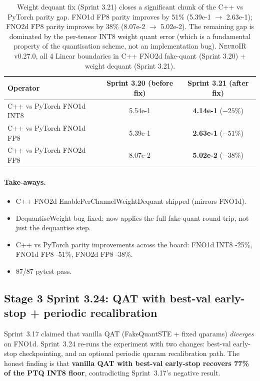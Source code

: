 \documentclass[10pt,twocolumn]{article}
\renewcommand{\texttt}[1]{{\normalfont\ttfamily #1}\normalfont\rmfamily}
\newcommand{\neuroir}{\textsc{NeuroIR}}
\begin{document}
\begin{table}[h]
\centering
\begin{tabular}{lcc}
\hline
\textbf{Operator} & \textbf{Sprint 3.20 (before fix)} & \textbf{Sprint 3.21 (after fix)} \\
\hline
C++ vs PyTorch FNO1d INT8 & 5.54e-1 & \textbf{4.14e-1} ($-25\%$) \\
C++ vs PyTorch FNO1d FP8 & 5.39e-1 & \textbf{2.63e-1} ($-51\%$) \\
C++ vs PyTorch FNO2d FP8 & 8.07e-2 & \textbf{5.02e-2} ($-38\%$) \\
\hline
\end{tabular}
\caption{Weight dequant fix (Sprint 3.21) closes a
significant chunk of the C++ vs PyTorch parity
gap.  FNO1d FP8 parity improves by 51\% (5.39e-1
$\to$ 2.63e-1); FNO2d FP8 parity improves by 38\%
(8.07e-2 $\to$ 5.02e-2).  The remaining gap is
dominated by the per-tensor INT8 weight quant
error (which is a fundamental property of the
quantisation scheme, not an implementation bug).
\neuroir{} v0.27.0, all 4 Linear boundaries in
C++ FNO2d fake-quant (Sprint 3.20) + weight
dequant (Sprint 3.21).}
\label{tab:fno2d-weight-dequant}
\end{table}

\paragraph{Take-aways.}
\begin{itemize}
\item C++ FNO2d \texttt{EnablePerChannelWeightDequant}
shipped (mirrors FNO1d).
\item \texttt{DequantiseWeight} bug fixed: now
applies the full fake-quant round-trip, not just
the dequantise step.
\item C++ vs PyTorch parity improvements across
the board: FNO1d INT8 -25\%, FNO1d FP8 -51\%,
FNO2d FP8 -38\%.
\item 87/87 pytest pass.
\end{itemize}

\subsection{Stage 3 Sprint 3.24: QAT with best-val early-stop + periodic recalibration}
\label{sec:qat-bestval}

Sprint~3.17 claimed that vanilla QAT (FakeQuantSTE +
fixed qparams) \emph{diverges} on FNO1d.  Sprint~3.24
re-runs the experiment with two changes: best-val
early-stop checkpointing, and an optional periodic
qparam recalibration path.  The honest finding is
that \textbf{vanilla QAT with best-val early-stop
recovers 77\% of the PTQ INT8 floor}, contradicting
Sprint~3.17's negative result.
\end{document}
